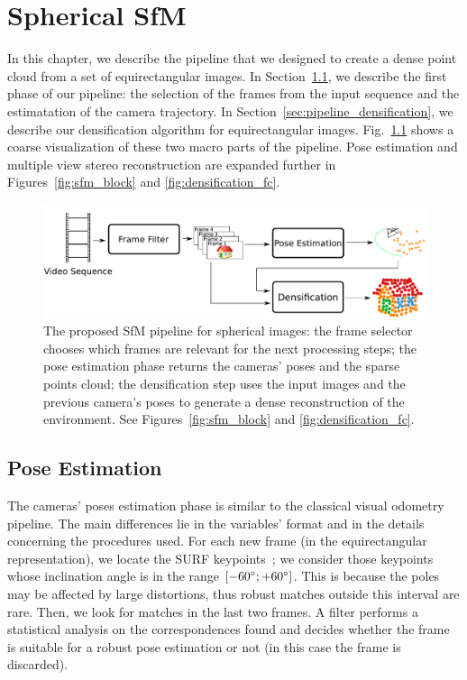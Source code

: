 \chapter{Spherical SfM}
In this chapter, we describe the pipeline that we designed to create a dense 
point cloud from a set of equirectangular images.
In Section~\ref{sec:pipeline_pose_estimation}, we describe the first phase of our
pipeline: the selection of the frames from the input sequence and the estimatation of
the camera trajectory. In Section~\ref{sec:pipeline_densification}, we describe 
our densification algorithm for equirectangular images.
Fig.~\ref{fig:pipeline_overview} shows a coarse visualization of these two macro parts of the 
pipeline. Pose estimation and multiple view stereo reconstruction are 
expanded further in Figures~\ref{fig:sfm_block} and \ref{fig:densification_fc}.

\begin{figure}
    \centering
    \includegraphics[width=0.8\linewidth]{img/pipeline_overview.pdf}
    \caption{The proposed SfM pipeline for spherical images: the frame selector chooses which frames are 
    relevant for the next processing steps; the pose estimation phase returns the cameras' 
    poses and the sparse points cloud; the densification step uses 
    the input images and the previous camera's poses to generate a dense
    reconstruction of the environment. See Figures~\ref{fig:sfm_block} and
    \ref{fig:densification_fc}.}
	\label{fig:pipeline_overview}
\end{figure}

\section{Pose Estimation}
\label{sec:pipeline_pose_estimation}
The cameras' poses estimation phase is similar to the classical visual 
odometry pipeline. The main differences lie in the variables' format and in 
the details concerning the procedures used.
For each new frame (in the equirectangular representation), we locate the
SURF keypoints~\cite{bay2006surf}; we consider those keypoints whose inclination angle is in the range $[-60\degree; +60\degree]$. This is because the poles may be affected by large 
distortions, thus robust matches outside this interval are rare.
Then, we look for matches in the last two frames. A filter performs a 
statistical analysis on the correspondences found and decides whether the frame 
is suitable for a robust pose estimation or not (in this case the frame is 
discarded).


